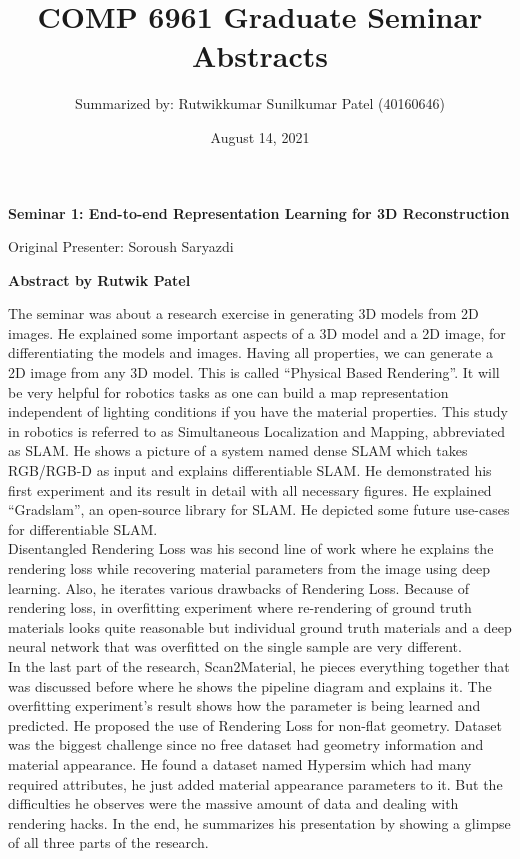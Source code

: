 \documentclass[12pt,letterpaper]{report}
\begin{document}
\title{COMP	6961 Graduate Seminar Abstracts}
\author{Summarized by: Rutwikkumar Sunilkumar Patel (40160646)}
\date{August 14, 2021}
\maketitle

\begin{center}
    \textbf{Seminar 1: End-to-end Representation Learning for 3D Reconstruction}
    
    \vspace{1em}
    Original Presenter: Soroush Saryazdi
    
    \vspace{2em}
    \textbf{Abstract by Rutwik Patel}
\end{center}

The seminar was about a research exercise in generating 3D models from 2D images. He explained some important aspects of a 3D model and a 2D image, for differentiating the models and images. Having all properties, we can generate a 2D image from any 3D model. This is called “Physical Based Rendering”. It will be very helpful for robotics tasks as one can build a map representation independent of lighting conditions if you have the material properties. This study in robotics is referred to as Simultaneous Localization and Mapping, abbreviated as SLAM. He shows a picture of a system named dense SLAM which takes RGB/RGB-D as input and explains differentiable SLAM. He demonstrated his first experiment and its result in detail with all necessary figures. He explained “Gradslam”, an open-source library for SLAM. He depicted some future use-cases for differentiable SLAM.\\

Disentangled Rendering Loss was his second line of work where he explains the rendering loss while recovering material parameters from the image using deep learning. Also, he iterates various drawbacks of Rendering Loss. Because of rendering loss, in overfitting experiment where re-rendering of ground truth materials looks quite reasonable but individual ground truth materials and a deep neural network that was overfitted on the single sample are very different. \\

In the last part of the research, Scan2Material, he pieces everything together that was discussed before where he shows the pipeline diagram and explains it. The overfitting experiment's result shows how the parameter is being learned and predicted. He proposed the use of Rendering Loss for non-flat geometry. Dataset was the biggest challenge since no free dataset had geometry information and material appearance. He found a dataset named Hypersim which had many required attributes, he just added material appearance parameters to it. But the difficulties he observes were the massive amount of data and dealing with rendering hacks. In the end, he summarizes his presentation by showing a glimpse of all three parts of the research.\\
\end{document}
